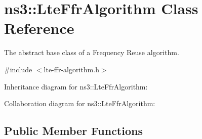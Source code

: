 \hypertarget{classns3_1_1LteFfrAlgorithm}{}\section{ns3\+:\+:Lte\+Ffr\+Algorithm Class Reference}
\label{classns3_1_1LteFfrAlgorithm}


The abstract base class of a Frequency Reuse algorithm.  




{\ttfamily \#include $<$lte-\/ffr-\/algorithm.\+h$>$}



Inheritance diagram for ns3\+:\+:Lte\+Ffr\+Algorithm\+:


Collaboration diagram for ns3\+:\+:Lte\+Ffr\+Algorithm\+:
\subsection*{Public Member Functions}
